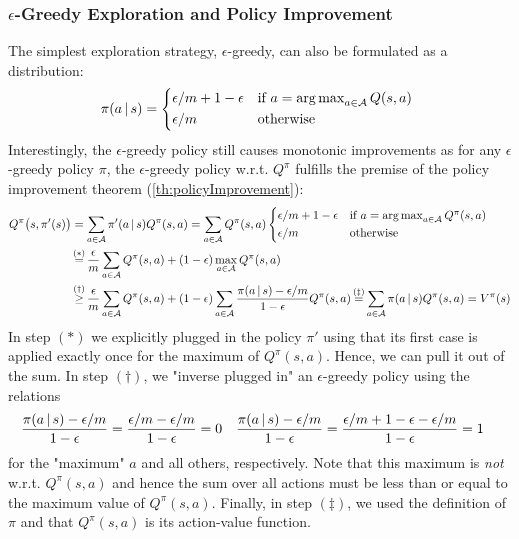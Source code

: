 			\subsubsection{\(\epsilon\)-Greedy Exploration and Policy Improvement}
				The simplest exploration strategy, \(\epsilon\)-greedy, can also be formulated as a distribution:
				\begin{equation}
					\pi(a \given s) =
					\begin{cases*}
						\epsilon/m + 1 - \epsilon & if \( a = \argmax_{a \in \mathcal{A}} Q(s, a) \) \\
						\epsilon/m                & otherwise
					\end{cases*}
				\end{equation}
				Interestingly, the \(\epsilon\)-greedy policy still causes monotonic improvements as for any \(\epsilon\)-greedy policy \(\pi\), the \(\epsilon\)-greedy policy w.r.t. \(Q^\pi\) fulfills the premise of the policy improvement theorem (\autoref{th:policyImprovement}):
				\begin{align}
					Q^\pi\bigl( s, \pi'(s) \bigr)
					 & = \sum_{a \in \mathcal{A}} \pi'(a \given s) Q^\pi(s, a)
					= \sum_{a \in \mathcal{A}} Q^\pi(s, a)
					\begin{cases*}
						\epsilon/m + 1 - \epsilon & if \( a = \argmax_{a \in \mathcal{A}} Q^\pi(s, a) \) \\
						\epsilon/m                & otherwise
					\end{cases*}                                                                                                       \\
					 & \overset{\mathclap{(\ast)}}{=} \frac{\epsilon}{m} \sum_{a \in \mathcal{A}} Q^\pi(s, a) + (1 - \epsilon) \max_{a \in \mathcal{A}} Q^\pi(s, a)                                                         \\
					 & \overset{\mathclap{(\dagger)}}{\geq} \frac{\epsilon}{m} \sum_{a \in \mathcal{A}} Q^\pi(s, a) + (1 - \epsilon) \sum_{a \in \mathcal{A}} \frac{\pi(a \given s) - \epsilon/m}{1 - \epsilon} Q^\pi(s, a)
					\overset{\mathclap{(\ddagger)}}{=} \sum_{a \in \mathcal{A}} \pi(a \given s) Q^\pi(s, a)
					= V^\pi(s)
				\end{align}
				In step \((\ast)\) we explicitly plugged in the policy \(\pi'\) using that its first case is applied exactly once for the maximum of \(Q^\pi(s, a)\). Hence, we can pull it out of the sum. In step \((\dagger)\), we "inverse plugged in" an \(\epsilon\)-greedy policy using the relations
				\begin{align}
					\frac{\pi(a \,\vert\, s) - \epsilon/m}{1 - \epsilon} & = \frac{\epsilon/m - \epsilon/m}{1 - \epsilon} = 0                &
					\frac{\pi(a \,\vert\, s) - \epsilon/m}{1 - \epsilon} & = \frac{\epsilon/m + 1 - \epsilon - \epsilon/m}{1 - \epsilon} = 1
				\end{align}
				for the "maximum" \(a\) and all others, respectively. Note that this maximum is \emph{not} w.r.t. \( Q^\pi(s, a) \) and hence the sum over all actions must be less than or equal to the maximum value of \(Q^\pi(s, a)\). Finally, in step \((\ddagger)\), we used the definition of \(\pi\) and that \(Q^\pi(s, a)\) is its action-value function.


